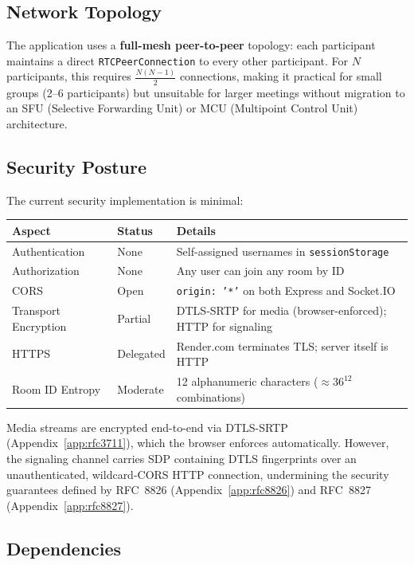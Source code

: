 \documentclass[11pt,letterpaper]{article}
\begin{document}
\subsection{Network Topology}

The application uses a \textbf{full-mesh peer-to-peer} topology: each participant maintains a direct \texttt{RTCPeerConnection} to every other participant. For $N$ participants, this requires $\frac{N(N-1)}{2}$ connections, making it practical for small groups (2--6 participants) but unsuitable for larger meetings without migration to an SFU (Selective Forwarding Unit) or MCU (Multipoint Control Unit) architecture.

\subsection{Security Posture}

The current security implementation is minimal:

\begin{center}
\begin{tabular}{lll}
\toprule
\textbf{Aspect} & \textbf{Status} & \textbf{Details} \\
\midrule
Authentication & None & Self-assigned usernames in \texttt{sessionStorage} \\
Authorization & None & Any user can join any room by ID \\
CORS & Open & \texttt{origin: '*'} on both Express and Socket.IO \\
Transport Encryption & Partial & DTLS-SRTP for media (browser-enforced); HTTP for signaling \\
HTTPS & Delegated & Render.com terminates TLS; server itself is HTTP \\
Room ID Entropy & Moderate & 12 alphanumeric characters ($\approx 36^{12}$ combinations) \\
\bottomrule
\end{tabular}
\end{center}

Media streams are encrypted end-to-end via DTLS-SRTP (Appendix~\ref{app:rfc3711}), which the browser enforces automatically. However, the signaling channel carries SDP containing DTLS fingerprints over an unauthenticated, wildcard-CORS HTTP connection, undermining the security guarantees defined by RFC~8826 (Appendix~\ref{app:rfc8826}) and RFC~8827 (Appendix~\ref{app:rfc8827}).

\subsection{Dependencies}
\end{document}
